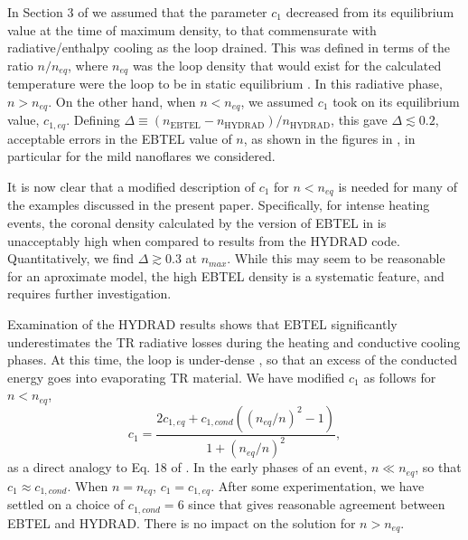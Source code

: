 In Section 3 of \citet{cargill_enthalpy-based_2012} we assumed that the parameter $c_1$ decreased from its equilibrium value at the time of maximum density, to that commensurate with radiative/enthalpy cooling as the loop drained. This was defined in terms of the ratio $n/n_{eq}$, where $n_{eq}$ was the loop density that would exist for the calculated temperature were the loop to be in static equilibrium \citep[Equation 17 of][]{cargill_enthalpy-based_2012}. In this radiative phase, $n > n_{eq}$. On the other hand, when $n < n_{eq}$, we assumed $c_1$ took on its equilibrium value, $c_{1,eq}$. Defining $\Delta\equiv(n_{\mathrm{EBTEL}} - n_{\mathrm{HYDRAD}})/n_{\mathrm{HYDRAD}}$, this gave $\Delta\lesssim0.2$, acceptable errors in the EBTEL value of $n$, as shown in the figures in \citet{cargill_enthalpy-based_2012}, in particular for the mild nanoflares we considered.

It is now clear that a modified description of $c_1$ for $n < n_{eq}$ is needed for many of the examples discussed in the present paper. Specifically, for intense heating events, the coronal density calculated by the version of EBTEL in \citet{cargill_enthalpy-based_2012} is unacceptably high when compared to results from the HYDRAD code. Quantitatively, we find $\Delta\gtrsim0.3$ at $n_{max}$. While this may seem to be reasonable for an aproximate model, the high EBTEL density is a systematic feature, and requires further investigation.

Examination of the HYDRAD results shows that EBTEL significantly underestimates the TR radiative losses during the heating and conductive cooling phases. At this time, the loop is under-dense \citep[e.g.][]{cargill_nanoflare_2004}, so that an excess of the conducted energy goes into evaporating TR material. We have modified $c_1$ as follows for $n < n_{eq}$,
\begin{equation}
    c_1 = \frac{2c_{1,eq} + c_{1,cond}((n_{eq}/n)^2-1)}{1+(n_{eq}/n)^2},
    \label{eq:c1_mod}
\end{equation}
as a direct analogy to Eq. 18 of \citet{cargill_enthalpy-based_2012}. In the early phases of an event, $n \ll n_{eq}$, so that $c_1 \approx c_{1,cond}$. When $n = n_{eq}$, $c_1 = c_{1,eq}$. After some experimentation, we have settled on a choice of $c_{1,cond} = 6$ since that gives reasonable agreement between EBTEL and HYDRAD. There is no impact on the solution for $n > n_{eq}$.

